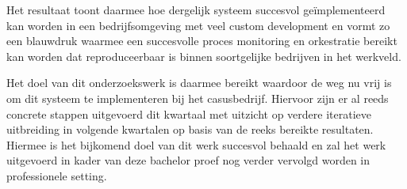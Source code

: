 Het resultaat toont daarmee hoe dergelijk systeem succesvol geïmplementeerd kan worden in een bedrijfsomgeving met veel custom development en vormt zo een blauwdruk waarmee een succesvolle proces monitoring en orkestratie bereikt kan worden dat reproduceerbaar is binnen soortgelijke bedrijven in het werkveld.\newline

Het doel van dit onderzoekswerk is daarmee bereikt waardoor de weg nu vrij is om dit systeem te implementeren bij het casusbedrijf. Hiervoor zijn er al reeds concrete stappen uitgevoerd dit kwartaal met uitzicht op verdere iteratieve uitbreiding in volgende kwartalen op basis van de reeks bereikte resultaten. Hiermee is het bijkomend doel van dit werk succesvol behaald en zal het werk uitgevoerd in kader van deze bachelor proef nog verder vervolgd worden in professionele setting.


